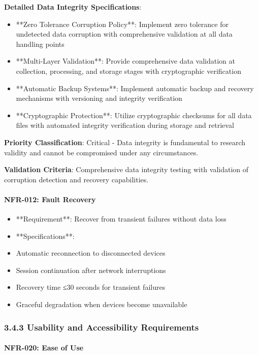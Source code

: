 \documentclass[12pt,a4paper]{article}
\begin{document}
\textbf{Detailed Data Integrity Specifications}:

\begin{itemize}
\item **Zero Tolerance Corruption Policy**: Implement zero tolerance for undetected data corruption with comprehensive
  validation at all data handling points
\item **Multi-Layer Validation**: Provide comprehensive data validation at collection, processing, and storage stages with
  cryptographic verification
\item **Automatic Backup Systems**: Implement automatic backup and recovery mechanisms with versioning and integrity
  verification
\item **Cryptographic Protection**: Utilize cryptographic checksums for all data files with automated integrity verification
  during storage and retrieval

\end{itemize}
\textbf{Priority Classification}: Critical - Data integrity is fundamental to research validity and cannot be compromised
under any circumstances.

\textbf{Validation Criteria}: Comprehensive data integrity testing with validation of corruption detection and recovery
capabilities.

\paragraph{NFR-012: Fault Recovery}

\begin{itemize}
\item **Requirement**: Recover from transient failures without data loss
\item **Specifications**:
\item Automatic reconnection to disconnected devices
\item Session continuation after network interruptions
\item Recovery time ≤30 seconds for transient failures
\item Graceful degradation when devices become unavailable

\end{itemize}
\subsubsection{3.4.3 Usability and Accessibility Requirements}

\paragraph{NFR-020: Ease of Use}
\end{document}
